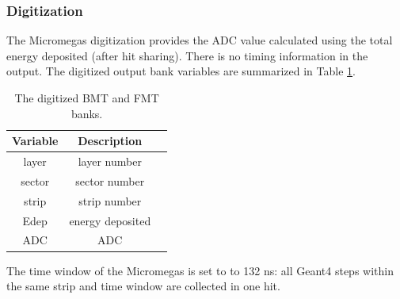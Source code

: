 \subsubsection{Digitization}

The Micromegas digitization provides the ADC value calculated using the total energy deposited (after hit sharing).
There is no timing information in the output.
The digitized output bank variables are summarized in Table \ref{tab:mmBank}.

\begin{table}[h]
	\begin{center}
		\begin{tabular}{| c | c | c |}
			\hline \hline
			Variable & Description  \\
			\hline
              layer  &      layer number   \\
             sector  &     sector number   \\
              strip  &      strip number   \\
               Edep  &  energy deposited   \\
                ADC  &               ADC   \\
			\hline \hline
		\end{tabular}
	\end{center}
	\caption{The digitized BMT and FMT banks.}\label{tab:mmBank}
\end{table}

The time window  of the Micromegas is set to to 132 ns: all Geant4 steps within the same strip and time window are collected in one hit.

